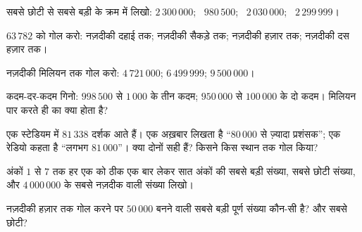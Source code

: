 \begin{exercise}[$\star$]\label{exo:g4:numbers:5}
सबसे छोटी से सबसे बड़ी के क्रम में लिखो: $2\,300\,000$; \ $980\,500$; \
$2\,030\,000$; \ $2\,299\,999$।
\end{exercise}

\begin{exercise}[$\star$]\label{exo:g4:numbers:6}
$63\,782$ को गोल करो: नज़दीकी दहाई तक; नज़दीकी सैकड़े तक; नज़दीकी
हज़ार तक; नज़दीकी दस हज़ार तक।
\end{exercise}

\begin{exercise}[$\star$]\label{exo:g4:numbers:7}
नज़दीकी मिलियन तक गोल करो: $4\,721\,000$; \quad $6\,499\,999$;
\quad $9\,500\,000$।
\end{exercise}

\begin{exercise}[$\star$]\label{exo:g4:numbers:8}
कदम-दर-कदम गिनो: $998\,500$ से $1\,000$ के तीन कदम; $950\,000$
से $100\,000$ के दो कदम। मिलियन पार करते ही  का क्या
होता है?
\end{exercise}

\begin{exercise}[$\star$]\label{exo:g4:numbers:9}
एक स्टेडियम में $81\,338$ दर्शक आते हैं। एक अख़बार लिखता है
``$80\,000$ से ज़्यादा प्रशंसक''; एक रेडियो कहता है ``लगभग
$81\,000$''। क्या दोनों सही हैं? किसने किस स्थान तक गोल
किया?
\end{exercise}

\begin{exercise}[$\star\star$]\label{exo:g4:numbers:10}
अंकों $1$ से $7$ तक हर एक को ठीक एक बार लेकर सात अंकों की सबसे
बड़ी संख्या, सबसे छोटी संख्या, और $4\,000\,000$ के सबसे नज़दीक
वाली संख्या लिखो।
\end{exercise}

\begin{exercise}[$\star\star$]\label{exo:g4:numbers:11}
नज़दीकी हज़ार तक गोल करने पर $50\,000$ बनने वाली सबसे बड़ी पूर्ण
संख्या कौन-सी है? और सबसे छोटी?
\end{exercise}
